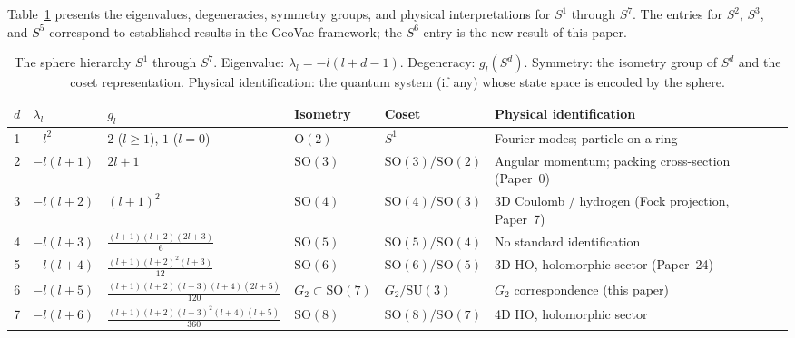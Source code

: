 \documentclass[twocolumn,pra,amsmath,amssymb,superscriptaddress]{revtex4-2}
\begin{document}
Table~\ref{tab:hierarchy} presents the eigenvalues, degeneracies,
symmetry groups, and physical interpretations for $S^1$ through
$S^7$.  The entries for $S^2$, $S^3$, and $S^5$ correspond to
established results in the GeoVac framework; the $S^6$ entry is
the new result of this paper.

\begin{table}
\caption{The sphere hierarchy $S^1$ through $S^7$.
Eigenvalue: $\lambda_l = -l(l+d-1)$.
Degeneracy: $g_l(S^d)$.
Symmetry: the isometry group of $S^d$ and the coset
representation.
Physical identification: the quantum system (if any) whose
state space is encoded by the sphere.
\label{tab:hierarchy}}
\begin{ruledtabular}
\begin{tabular}{clllll}
$d$ & $\lambda_l$ & $g_l$ & Isometry & Coset & Physical identification \\
\hline
1 & $-l^2$      & $2$ ($l \geq 1$), $1$ ($l=0$) & $\mathrm{O}(2)$ & $S^1$ & Fourier modes; particle on a ring \\
2 & $-l(l+1)$   & $2l+1$                         & $\mathrm{SO}(3)$ & $\mathrm{SO}(3)/\mathrm{SO}(2)$ & Angular momentum; packing cross-section (Paper~0) \\
3 & $-l(l+2)$   & $(l+1)^2$                      & $\mathrm{SO}(4)$ & $\mathrm{SO}(4)/\mathrm{SO}(3)$ & 3D Coulomb / hydrogen (Fock projection, Paper~7) \\
4 & $-l(l+3)$   & $\frac{(l+1)(l+2)(2l+3)}{6}$   & $\mathrm{SO}(5)$ & $\mathrm{SO}(5)/\mathrm{SO}(4)$ & No standard identification \\
5 & $-l(l+4)$   & $\frac{(l+1)(l+2)^2(l+3)}{12}$\footnotemark[1]    & $\mathrm{SO}(6)$ & $\mathrm{SO}(6)/\mathrm{SO}(5)$ & 3D HO, holomorphic sector (Paper~24) \\
6 & $-l(l+5)$   & $\frac{(l+1)(l+2)(l+3)(l+4)(2l+5)}{120}$ & $G_2 \subset \mathrm{SO}(7)$ & $G_2/\mathrm{SU}(3)$ & $G_2$ correspondence (this paper) \\
7 & $-l(l+6)$   & $\frac{(l+1)(l+2)(l+3)^2(l+4)(l+5)}{360}$\footnotemark[2]  & $\mathrm{SO}(8)$ & $\mathrm{SO}(8)/\mathrm{SO}(7)$ & 4D HO, holomorphic sector \\
\end{tabular}
\end{ruledtabular}
\end{table}
\end{document}
